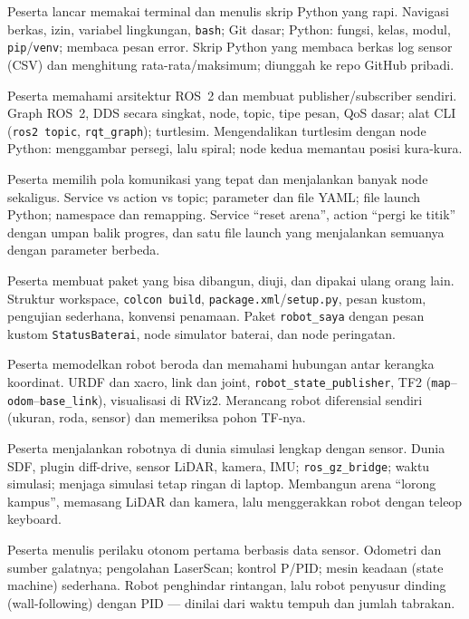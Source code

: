 \documentclass{rtl}
\begin{document}
{Peserta lancar memakai terminal dan menulis skrip Python yang rapi.}
{Navigasi berkas, izin, variabel lingkungan, \texttt{bash}; Git dasar; Python: fungsi, kelas, modul, \texttt{pip}/\texttt{venv}; membaca pesan error.}
{Skrip Python yang membaca berkas log sensor (CSV) dan menghitung rata-rata/maksimum; diunggah ke repo GitHub pribadi.}

{Peserta memahami arsitektur ROS~2 dan membuat publisher/subscriber sendiri.}
{Graph ROS~2, DDS secara singkat, node, topic, tipe pesan, QoS dasar; alat CLI (\texttt{ros2 topic}, \texttt{rqt\_graph}); turtlesim.}
{Mengendalikan turtlesim dengan node Python: menggambar persegi, lalu spiral; node kedua memantau posisi kura-kura.}

{Peserta memilih pola komunikasi yang tepat dan menjalankan banyak node sekaligus.}
{Service vs action vs topic; parameter dan file YAML; file launch Python; namespace dan remapping.}
{Service ``reset arena'', action ``pergi ke titik'' dengan umpan balik progres, dan satu file launch yang menjalankan semuanya dengan parameter berbeda.}

{Peserta membuat paket yang bisa dibangun, diuji, dan dipakai ulang orang lain.}
{Struktur workspace, \texttt{colcon build}, \texttt{package.xml}/\texttt{setup.py}, pesan kustom, pengujian sederhana, konvensi penamaan.}
{Paket \texttt{robot\_saya} dengan pesan kustom \texttt{StatusBaterai}, node simulator baterai, dan node peringatan.}

{Peserta memodelkan robot beroda dan memahami hubungan antar kerangka koordinat.}
{URDF dan xacro, link dan joint, \texttt{robot\_state\_publisher}, TF2 (\texttt{map}--\texttt{odom}--\texttt{base\_link}), visualisasi di RViz2.}
{Merancang robot diferensial sendiri (ukuran, roda, sensor) dan memeriksa pohon TF-nya.}

{Peserta menjalankan robotnya di dunia simulasi lengkap dengan sensor.}
{Dunia SDF, plugin diff-drive, sensor LiDAR, kamera, IMU; \texttt{ros\_gz\_bridge}; waktu simulasi; menjaga simulasi tetap ringan di laptop.}
{Membangun arena ``lorong kampus'', memasang LiDAR dan kamera, lalu menggerakkan robot dengan teleop keyboard.}

{Peserta menulis perilaku otonom pertama berbasis data sensor.}
{Odometri dan sumber galatnya; pengolahan LaserScan; kontrol P/PID; mesin keadaan (state machine) sederhana.}
{Robot penghindar rintangan, lalu robot penyusur dinding (wall-following) dengan PID --- dinilai dari waktu tempuh dan jumlah tabrakan.}
\end{document}
